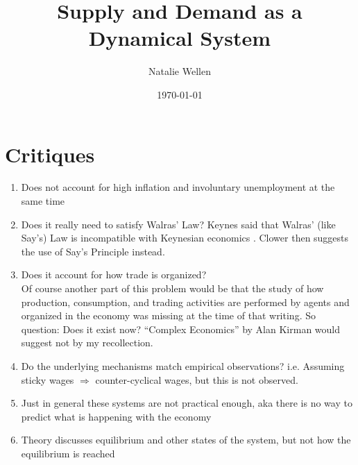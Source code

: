 \documentclass{article}
\title{Supply and Demand as a Dynamical System}
\author{Natalie Wellen}
\date{\today}
\begin{document}
\maketitle

\section{Critiques}
\begin{enumerate}
	\item Does not account for high inflation and involuntary unemployment at the same time \cite{mankiw_quick_1990}
	\item Does it really need to satisfy Walras' Law? Keynes said that Walras' (like Say's) Law is incompatible with Keynesian economics \cite{clower_keynesian_1984}. Clower then suggests the use of Say's Principle instead.
	\item Does it account for how trade is organized? \cite{clower_coordination_1984}\\
	Of course another part of this problem would be that the study of how production, consumption, and trading activities are performed by agents and organized in the economy was missing at the time of that writing. So question: Does it exist now? ``Complex Economics'' by Alan Kirman would suggest not by my recollection. 
	\item Do the underlying mechanisms match empirical observations? i.e. Assuming sticky wages $\Rightarrow$ counter-cyclical wages, but this is not observed. \cite{mankiw_quick_1990}
	\item Just in general these systems are not practical enough, aka there is no way to predict what is happening with the economy\cite{mankiw_quick_1990}
	\item Theory discusses equilibrium and other states of the system, but not how the equilibrium is reached \cite{smale_dynamics_1976}
\end{enumerate}

\end{document}
